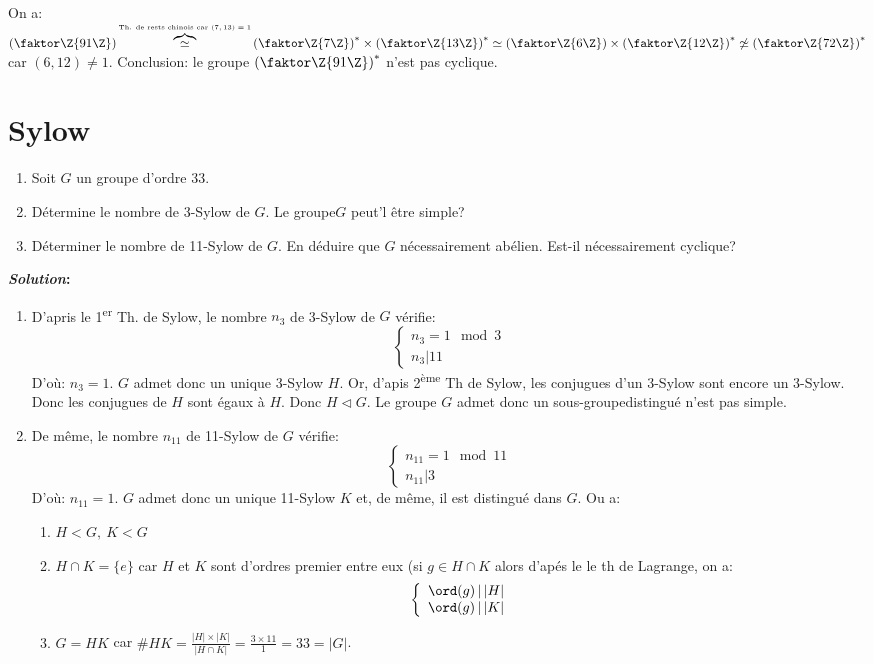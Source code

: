 \begin{remark}
	On a: $\left(\faktor\Z{91\Z}\right)\overbrace{\simeq}^{\mbox{\tiny Th. de rests chinois car $(7,13)=1$}} \left(\faktor\Z{7\Z}\right)^\ast\times \left(\faktor\Z{13\Z}\right)^\ast\simeq \left(\faktor\Z{6\Z}\right)\times \left(\faktor\Z{12\Z}\right)^\ast\not\simeq \left(\faktor\Z{72\Z}\right)^\ast$ car $(6,12)\neq 1$. Conclusion: le groupe $\left(\faktor\Z{91\Z}\right)^\ast$ n'est pas cyclique.
\end{remark}

\section{Sylow}

\begin{examplebox}
	\begin{enumerate}
		\item Soit $G$ un groupe d'ordre 33.	
		\item Détermine le nombre de 3-Sylow de $G$. Le groupe$G$ peut'l être simple?
		\item Déterminer le nombre de 11-Sylow de $G$. En déduire que $G$ nécessairement abélien. Est-il nécessairement cyclique?
	\end{enumerate}
		\textbf{\emph{Solution}:}

	\begin{enumerate}
		\item D'apris le 1\textsuperscript{er} Th. de Sylow, le nombre $n_3$ de 3-Sylow de $G$ vérifie:
		$$\left\{\begin{array}{r}n_3 = 1\mod 3\\n_3 | 11\end{array}\right.$$
		D'où: $n_3=1$. $G$ admet donc un unique 3-Sylow $H$. Or, d'apis 2\textsuperscript{ème} Th de Sylow, les conjugues d'un 3-Sylow sont encore un 3-Sylow. Donc les conjugues de $H$ sont égaux à $H$. Donc $H\lhd G$. Le groupe $G$ admet donc un sous-groupedistingué n'est pas simple.
		
		\item De même, le nombre $n_{11}$ de 11-Sylow de $G$ vérifie:
		$$\left\{\begin{array}{r}n_{11} = 1\mod 11\\n_{11} | 3\end{array}\right.$$
		D'où: $n_{11}=1$.
		$G$ admet donc un unique 11-Sylow $K$ et, de même, il est distingué dans $G$.
		Ou a:
		\begin{enumerate}
			\item $H<  G,\ K<  G$
			\item $H\cap K=\{e\}$ car $H$ et $K$ sont d'ordres premier entre eux (si $g\in H\cap K$ alors d'apés le le th de Lagrange, on a:
			$$\left\{\begin{array}{r}\ord(g)\,|\, |H|\\\ord(g)\,|\, |K|\end{array}\right.$$
			\item $G=HK$ car $\#HK=\frac{|H|\times|K|}{|H\cap K|}=\frac{3\times 11}{1}=33=|G|$. 
		\end{enumerate}


\end{enumerate}
\end{examplebox}
